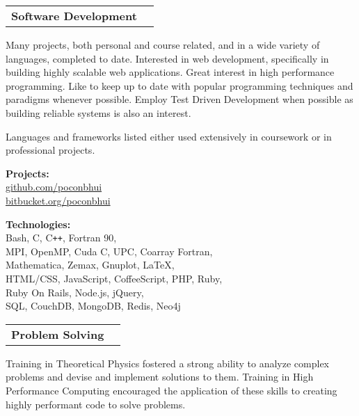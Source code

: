 \documentclass[11pt]{article}
\makeatletter
\newenvironment{resumeSubSectionHeader}{
    \par
    \begin{tabular*}{\textwidth}{l@{\extracolsep{\fill}}r}
    \par
} {
    \end{tabular*}
    \par
}
\newenvironment{resumeSubSectionBody}{
    \par
    \vspace{-0.8\parskip}
    \begin{small}
    \par
} {
    \par
    \end{small}
    \par
}
\makeatother
\begin{document}
%
%
\begin{resumeSubSectionHeader}

    \textbf{Software Development}

\end{resumeSubSectionHeader}
\begin{resumeSubSectionBody}

    Many projects, both personal and course related, and in a wide variety
    of languages, completed to date.
    Interested in web development, specifically in building highly
    scalable web applications.
    Great interest in high performance programming.
    Like to keep up to date with popular programming techniques and paradigms
    whenever possible.
    Employ Test Driven Development when possible as building reliable systems
    is also an interest.

    Languages and frameworks listed either used extensively in coursework
    or in professional projects.

    \begin{description}
        \item{\bf Projects:} \\
            \href{https://github.com/poconbhui}{github.com/poconbhui} \\
            \href{https://bitbucket.org/poconbhui}{bitbucket.org/poconbhui}

        \item{\bf Technologies:} \\
            Bash, C, C\verb!++!, Fortran 90, \\
            MPI, OpenMP, Cuda C, UPC, Coarray Fortran, \\
            Mathematica, Zemax, Gnuplot, LaTeX, \\
            HTML/CSS, JavaScript, CoffeeScript, PHP, Ruby, \\
            Ruby On Rails, Node.js, jQuery, \\
            SQL, CouchDB, MongoDB, Redis, Neo4j
    \end{description}

\end{resumeSubSectionBody}


%
%
\begin{resumeSubSectionHeader}

    \textbf{Problem Solving}

\end{resumeSubSectionHeader}
\begin{resumeSubSectionBody}

    Training in Theoretical Physics fostered a strong ability to
    analyze complex problems and devise and implement solutions to them.
    Training in High Performance Computing encouraged the application
    of these skills to creating highly performant code to solve
    problems.

\end{resumeSubSectionBody}
\end{document}

